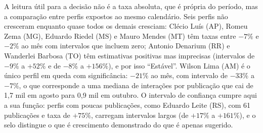 A leitura útil para a decisão não é a taxa absoluta, que é própria do período, mas a comparação entre perfis expostos ao mesmo calendário. Seis perfis não cresceram enquanto quase todos os demais cresciam: Clécio Luís (AP), Romeu Zema (MG), Eduardo Riedel (MS) e Mauro Mendes (MT) têm taxas entre $-7\%$ e $-2\%$ ao mês com intervalos que incluem zero; Antonio Denarium (RR) e Wanderlei Barbosa (TO) têm estimativas positivas mas imprecisas (intervalos de $-9\%$ a $+52\%$ e de $-8\%$ a $+156\%$), e por isso ``Estável''. Wilson Lima (AM) é o único perfil em queda com significância: $-21\%$ ao mês, com intervalo de $-33\%$ a $-7\%$, o que corresponde a uma mediana de interações por publicação que cai de 1,7 mil em agosto para 0,9 mil em outubro. O intervalo de confiança cumpre aqui a sua função: perfis com poucas publicações, como Eduardo Leite (RS), com 61 publicações e taxa de $+75\%$, carregam intervalos largos (de $+17\%$ a $+161\%$), e o selo distingue o que é crescimento demonstrado do que é apenas sugerido.

